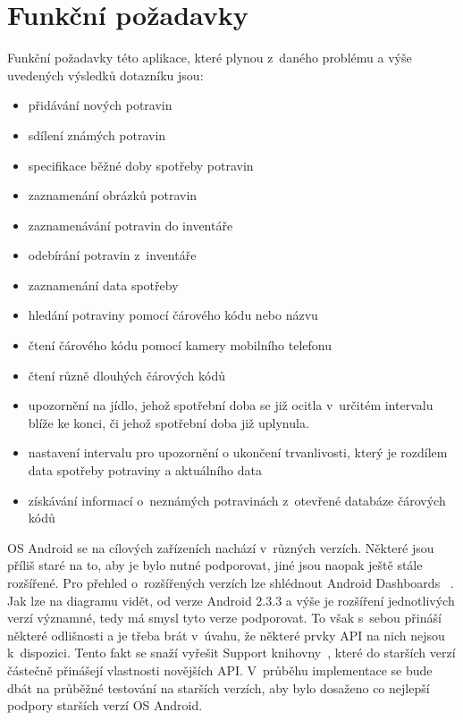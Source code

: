 \documentclass[thesis=B,czech]{FITthesis}[2013/10/20]
\begin{document}
\section{Funkční požadavky}

Funkční požadavky této aplikace, které plynou z~daného problému a výše uvedených výsledků dotazníku jsou:
\begin{itemize}
  \item přidávání nových potravin
  \item sdílení známých potravin
  \item specifikace běžné doby spotřeby potravin
  \item zaznamenání obrázků potravin
  \item zaznamenávání potravin do inventáře
  \item odebírání potravin z~inventáře
  \item zaznamenání data spotřeby
  \item hledání potraviny pomocí čárového kódu nebo názvu
  \item čtení čárového kódu pomocí kamery mobilního telefonu
  \item čtení různě dlouhých čárových kódů
  \item upozornění na jídlo, jehož spotřební doba se již ocitla v~určitém intervalu blíže ke konci, či jehož spotřební doba již uplynula.
  \item nastavení intervalu pro upozornění o ukončení trvanlivosti, který je rozdílem data spotřeby potraviny a aktuálního data
  \item získávání informací o~neznámých potravinách z~otevřené databáze čárových kódů
\end{itemize}

OS Android se na cílových zařízeních nachází v~různých verzích. Některé jsou příliš staré na to, aby je bylo nutné podporovat, jiné jsou naopak ještě stále rozšířené. Pro přehled o~rozšířených verzích lze shlédnout Android Dashboards ~\cite{dashboards}. Jak lze na diagramu vidět, od verze Android 2.3.3 a výše je rozšíření jednotlivých verzí významné, tedy má smysl tyto verze podporovat. To však s~sebou přináší některé odlišnosti a je třeba brát v~úvahu, že některé prvky API na nich nejsou k~dispozici. Tento fakt se snaží vyřešit Support knihovny~\cite{support}, které do starších verzí částečně přinášejí vlastnosti novějších API. V~průběhu implementace se bude dbát na průběžné testování na starších verzích, aby bylo dosaženo co nejlepší podpory starších verzí OS Android.
\end{document}

